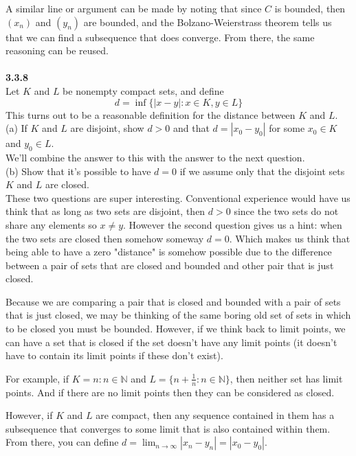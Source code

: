 A similar line or argument can be made by noting that since $C$ is bounded, then $(x_n)$ and $(y_n)$ are bounded,
and the Bolzano-Weierstrass theorem tells us that we can find a subsequence that does converge.
From there, the same reasoning can be reused.
\\~\\



\textbf{3.3.8}
\\

Let $K$ and $L$ be nonempty compact sets, and define
$$
d = \inf\{ |x-y| : x\in K, y\in L \}
$$
This turns out to be a reasonable definition for the distance between $K$ and $L$.
\\

(a) If $K$ and $L$ are disjoint, show $d>0$ and that $d = |x_0 - y_0|$ for some $x_0 \in K$ and $y_0 \in L$.
\\

We'll combine the answer to this with the answer to the next question.
\\

(b) Show that it's possible to have $d = 0$ if we assume only that the disjoint sets $K$ and $L$ are closed.
\\

These two questions are super interesting.
Conventional experience would have us think that as long as two sets are disjoint, then $d > 0$
since the two sets do not share any elements so $x\neq y$.
However the second question gives us a hint: when the two sets are closed then somehow someway $d = 0$.
Which makes us think that being able to have a zero "distance" is somehow possible due to the difference between
a pair of sets that are closed and bounded and other pair that is just closed.

Because we are comparing a pair that is closed and bounded with a pair of sets that is just closed,
we may be thinking of the same boring old set of sets in which to be closed you must be bounded.
However, if we think back to limit points, we can have a set that is closed if the set doesn't have any limit points
(it doesn't have to contain its limit points if these don't exist).

For example, if $K = {n : n\in\mathbb{N}}$ and $L = \{ n + \frac{1}{n} : n\in\mathbb{N} \}$, then neither set has
limit points.
And if there are no limit points then they can be considered as closed.

However, if $K$ and $L$ are compact, then any sequence contained in them has a subsequence that converges
to some limit that is also contained within them.
From there, you can define $d = \lim_{n\rightarrow \infty} |x_n - y_n| = |x_0 - y_0|$.
\\




